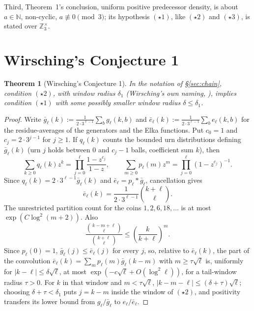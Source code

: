 \documentclass[11pt]{article}
\newtheorem{theorem}{Theorem}[section]
\theoremstyle{remark}
\begin{document}
Third, Theorem~1's conclusion, uniform positive predecessor density, is
about $a\in\mathbb N$, non-cyclic, $a\not\equiv0\pmod3$; its hypothesis
$(\star1)$, like $(\star2)$ and $(\star3)$, is stated over
$\mathbb Z_3^\times$.

\section{Wirsching's Conjecture 1}
\label{sec:conj1}

\begin{theorem}[Wirsching's Conjecture 1]\label{thm:wirsching-conj1}
In the notation of \S\ref{sec:chain}, condition $(\star2)$, with window
radius $\delta_1$ (Wirsching's own naming, \cite[\S2]{Wirsching2003}),
implies condition $(\star1)$ with some possibly
smaller window radius $\delta\le\delta_1$.
\end{theorem}

\begin{proof}
Write $\bar g_\ell(k):=\frac{1}{2\cdot3^{\ell-1}}\sum_bg_\ell(k,b)$ and
$\bar e_\ell(k):=\frac{1}{2\cdot3^{\ell-1}}\sum_be_\ell(k,b)$ for the
residue-averages of the generators and the Elka functions. Put
$c_0=1$ and $c_j=2\cdot3^{j-1}$ for $j\ge1$. If $q_\ell(k)$ counts
the bounded urn distributions defining $\bar g_\ell(k)$ (urn $j$ holds
between $0$ and $c_j-1$ balls, coefficient sum $k$), then
\[
 \sum_{k\ge0}q_\ell(k)z^k
 =\prod_{j=0}^\ell\frac{1-z^{c_j}}{1-z},\qquad
 \sum_{m\ge0}p_\ell(m)z^m
 =\prod_{j=0}^\ell(1-z^{c_j})^{-1}.
\]
Since $q_\ell(k)=2\cdot3^{\ell-1}\bar g_\ell(k)$ and
$\bar e_\ell=p_\ell*\bar g_\ell$, cancellation gives
\[
 \bar e_\ell(k)=\frac{1}{2\cdot3^{\ell-1}}
                 \binom{k+\ell}{\ell}.
\]
The unrestricted partition count for the coins $1,2,6,18,\ldots$ is
at most $\exp(C\log^2(m+2))$. Also
\[
 \frac{\binom{k-m+\ell}{\ell}}{\binom{k+\ell}{\ell}}
 \le \left(\frac{k}{k+\ell}\right)^m.
\]
Since $p_\ell(0)=1$, $\bar g_\ell(j)\le\bar e_\ell(j)$ for every $j$, so,
relative to $\bar e_\ell(k)$, the part of the convolution
$\bar e_\ell(k)=\sum_mp_\ell(m)\bar g_\ell(k-m)$ with $m\ge\tau\sqrt\ell$
is, uniformly for $|k-\ell|\le\delta\sqrt\ell$, at most
$\exp(-c\sqrt\ell+O(\log^2\ell))$, for a tail-window radius $\tau>0$.
For $k$ in that window and
$m<\tau\sqrt\ell$, $|k-m-\ell|\le(\delta+\tau)\sqrt\ell$; choosing
$\delta+\tau<\delta_1$ puts $j=k-m$ inside the window of $(\star2)$,
and positivity transfers its lower bound from
$g_\ell/\bar g_\ell$ to $e_\ell/\bar e_\ell$.
\end{proof}
\end{document}

